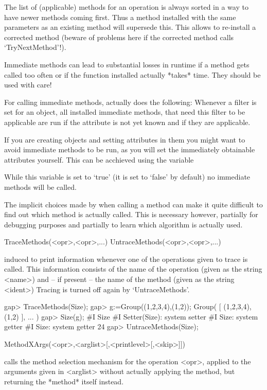 \danger
The list of (applicable) methods for an operation is always sorted in a way
to have newer methods coming first. Thus a method installed with the same
parameters as an existing method will supersede this. This allows to
re-install a corrected method (beware of problems here if the corrected
method calls `TryNextMethod'!).


Immediate methods can lead to substantial losses in runtime if a
method gets called too often or if the function installed actually *takes*
time. They should be used with care!

\danger
For calling immediate methods, {\GAP} actually does the following: 
Whenever a filter is set for an object, all installed immediate methods,
that need this filter to be applicable are run if the attribute is not yet
known and if they are applicable.

\danger
If you are creating objects and setting attributes in them you might want to
avoid immediate methods to be run, as you will set the immediately obtainable
attributes yourself. This can be acchieved using the variable


While this variable is set to `true' (it is set to `false' by default) no
immediate methods will be called.


The implicit choices made by {\GAP} when calling a method can make it quite
difficult to find out which method is actually called. This is necessary
however, partially for debugging purposes and partially to learn which
algorithm is actually used. 

\>TraceMethods(<opr>,<opr>,...)
\>UntraceMethods(<opr>,<opr>,...)

induced {\GAP} to print information whenever one of the operations given to
trace is called. This information consists of the name of the operation
(given as the string <name>) and -- if present -- the name of the method
(given as the string <ident>)
Tracing is turned off again by `UntraceMethods'.

\beginexample
gap> TraceMethods(Size);
gap> g:=Group((1,2,3,4),(1,2));
Group( [ (1,2,3,4), (1,2) ], ... )
gap> Size(g);
#I  Size
#I  Setter(Size): system setter
#I  Size: system getter
#I  Size: system getter
24
gap> UntraceMethods(Size);
\endexample

\>MethodXArgs(<opr>,<arglist>[,<printlevel>[,<skip>]])

calls the method selection mechanism for the operation <opr>, applied to the
arguments given in <arglist> without actually applying the method, but
returning the *method* itself instead.

